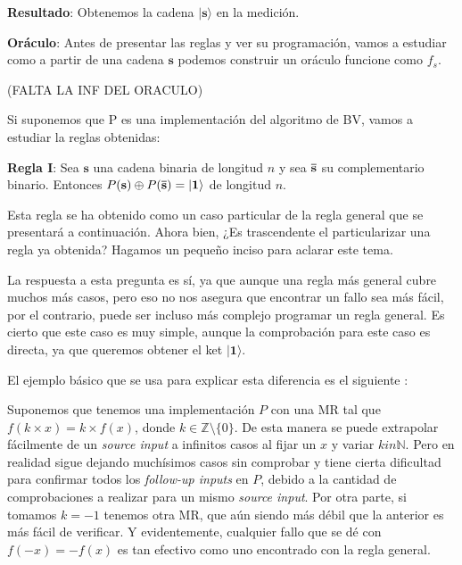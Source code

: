  \vspace{30pt}

 \textbf{Resultado}: Obtenemos la cadena $|\mathbf{s}\rangle$ en la medición.\newline

 \textbf{Oráculo}: Antes de presentar las reglas y ver su programación, vamos a estudiar como a partir de una cadena $\mathbf{s}$ podemos construir un oráculo funcione como $f_{s}$. \newline

 (FALTA LA INF DEL ORACULO)\newline

 Si suponemos que P es una implementación del algoritmo de BV, vamos a estudiar la reglas obtenidas: \newline

 \textbf{Regla I}\label{R:BV:1}: Sea $\mathbf{s}$ una cadena binaria de longitud $n$ y sea $\mathbf{\Bar{s}}$ su complementario binario. Entonces $P(\mathbf{s})\oplus P(\mathbf{\Bar{s}})=|\mathbf{1}\rangle$ de longitud $n$.\newline

 Esta regla se ha obtenido como un caso particular de la regla general que se presentará a continuación. Ahora bien, ¿Es trascendente el particularizar una regla ya obtenida? Hagamos un pequeño inciso para aclarar este tema.\newline

 La respuesta a esta pregunta es sí, ya que aunque una regla más general cubre muchos más casos, pero eso no nos asegura que encontrar un fallo sea más fácil, por el contrario, puede ser incluso más complejo programar un regla general. Es cierto que este caso es muy simple, aunque la comprobación para este caso es directa, ya que queremos obtener el ket $|\mathbf{1}\rangle$. \newline

 El ejemplo básico que se usa para explicar esta diferencia es el siguiente \cite{AR:MTmain:2008}:\newline

Suponemos que tenemos una implementación $P$ con una MR tal que $f(k\times x)=k\times f(x)$, donde $k \in \mathbb{Z} \setminus \{0\}$. De esta manera se puede extrapolar fácilmente de un \textit{source input} a infinitos casos al fijar un $x$ y variar $k in \mathbb{N}$. Pero en realidad sigue dejando muchísimos casos sin comprobar y tiene cierta dificultad para confirmar todos los \textit{follow-up inputs} en $P$, debido a la cantidad de comprobaciones a realizar para un mismo \textit{source input}. Por otra parte, si tomamos $k=-1$ tenemos otra MR, que aún siendo más débil que la anterior es más fácil de verificar. Y evidentemente, cualquier fallo que se dé con $f(-x)=-f(x)$ es tan efectivo como uno encontrado con la regla general.\newline

